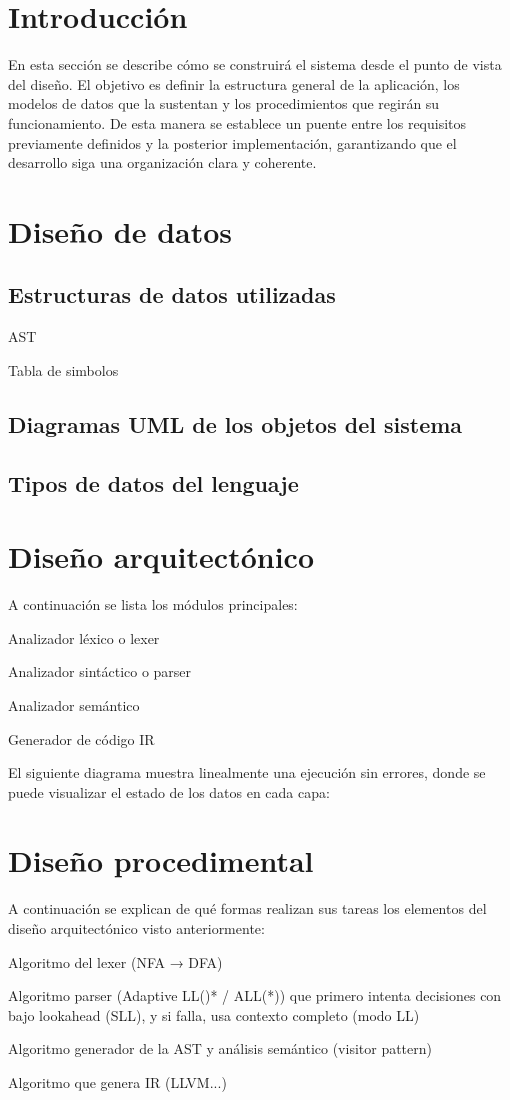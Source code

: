 
\section{Introducción}
En esta sección se describe cómo se construirá el sistema desde el punto de vista del diseño. El objetivo es definir la estructura general de la aplicación, los modelos de datos que la sustentan y los procedimientos que regirán su funcionamiento. De esta manera se establece un puente entre los requisitos previamente definidos y la posterior implementación, garantizando que el desarrollo siga una organización clara y coherente.

\section{Diseño de datos} 
\subsection{Estructuras de datos utilizadas}
AST

Tabla de simbolos

\subsection{Diagramas UML de los objetos del sistema}

\subsection{Tipos de datos del lenguaje}


\section{Diseño arquitectónico} 
A continuación se lista los módulos principales:

Analizador léxico o lexer

Analizador sintáctico o parser

Analizador semántico

Generador de código IR

El siguiente diagrama muestra linealmente una ejecución sin errores, donde se puede visualizar el estado de los datos en cada capa:

\section{Diseño procedimental} 
A continuación se explican de qué formas realizan sus tareas los elementos del diseño arquitectónico visto anteriormente:

Algoritmo del lexer (NFA → DFA)

Algoritmo parser (Adaptive LL()* / ALL(*)) que primero intenta decisiones con bajo lookahead (SLL), y si falla, usa contexto completo (modo LL)

Algoritmo generador de la AST y análisis semántico (visitor pattern)

Algoritmo que genera IR (LLVM...) 